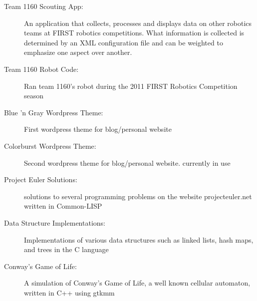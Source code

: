 \documentclass[letterpaper,11pt]{article}
\begin{document}
    \begin{description}
      \item[Team 1160 Scouting App:]
               { \footnotesize An application that collects, processes
                     and displays data on other robotics teams at
                     FIRST robotics competitions. What information is
                     collected is determined by an XML configuration
                     file and can be weighted to emphasize one aspect
                     over another.
               }
      \item[Team 1160 Robot Code:]
               { \footnotesize Ran team 1160's robot
                     during the 2011 FIRST Robotics Competition
                     season
               }
      \item[Blue 'n Gray Wordpress Theme:]
               { \footnotesize First wordpress theme for blog/personal website
               }
	  \item[Colorburst Wordpress Theme:]
               { \footnotesize Second wordpress theme for
                 blog/personal website. currently in use
               }
		\item[Project Euler Solutions:]
               { \footnotesize solutions to several programming problems on the
                     website projecteuler.net written in Common-LISP
               }
		\item[Data Structure Implementations:]
               { \footnotesize Implementations of various data structures
                     such as linked lists, hash maps, and trees in the
                     C language
               }
		\item[Conway's Game of Life:]
               { \footnotesize A simulation of Conway's Game of
                     Life, a well known cellular automaton, written in
                     C++ using gtkmm
               }
    \end{description} %
           
\end{document}
